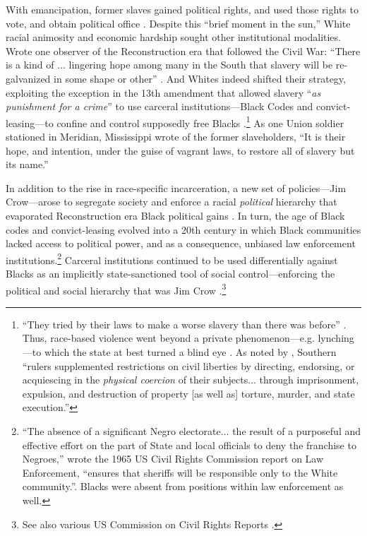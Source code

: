 \documentclass[12pt]{article}
\begin{document}
With emancipation, former slaves gained political rights, and used those rights to vote, and obtain political office .  Despite this ``brief moment in the sun,'' White racial animosity and economic hardship sought other institutional modalities.  Wrote one observer of the Reconstruction era that followed the Civil War: ``There is a kind of $\ldots$ lingering hope among many in the South that slavery will be re-galvanized in some shape or other'' . And Whites indeed shifted their strategy, exploiting the exception in the 13th amendment that allowed slavery ``\emph{as punishment for a crime}'' to use carceral institutions---Black Codes and convict-leasing---to confine and control supposedly free Blacks .\footnote{``They tried by their laws to make a worse slavery than there was before'' . Thus, race-based violence went beyond a private phenomenon---e.g. lynching---to which the state at best turned a blind eye .  As noted by , Southern ``rulers supplemented restrictions on civil liberties by directing, endorsing, or acquiescing in the \emph{physical coercion} of their subjects$\ldots$ through imprisonment, expulsion, and destruction of property [as well as] torture, murder, and state execution.''}  As one Union soldier stationed in Meridian, Mississippi wrote of the former slaveholders, ``It is their hope, and intention, under the guise of vagrant laws, to restore all of slavery but its name.''



In addition to the rise in race-specific incarceration, a new set of policies---Jim Crow---arose to segregate society and enforce a racial \emph{political} hierarchy that evaporated Reconstruction era Black political gains . In turn, the age of Black codes and convict-leasing evolved into a 20th century in which Black communities lacked access to political power, and as a consequence, unbiased law enforcement institutions.\footnote{``The absence of a significant Negro electorate$\ldots$ the result of a purposeful and effective effort on the part of State and local officials to deny the franchise to Negroes,'' wrote the 1965 US Civil Rights Commission report on Law Enforcement, ``ensures that sheriffs will be responsible only to the White community.''\citep[87]{USCCRUnitedStatesCommissiononCivilRights:1965wk}.  Blacks were absent from positions within law enforcement as well.}  Carceral institutions continued to be used differentially against Blacks as an implicitly state-sanctioned tool of social control---enforcing the political and social hierarchy that was Jim Crow .\footnote{See also various US Commission on Civil Rights Reports .}
\end{document}
